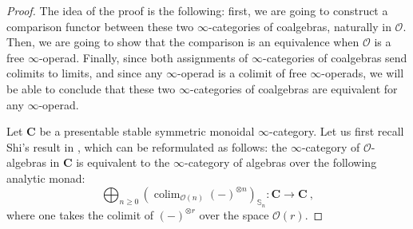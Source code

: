 \documentclass[a4paper,12pt]{amsart}
\DeclareMathOperator*{\colim}{colim}
\theoremstyle{plain}
\theoremstyle{definition}
\theoremstyle{remark}
\begin{document}
\begin{proof}
The idea of the proof is the following: first, we are going to construct a comparison functor between these two $\infty$-categories of coalgebras, naturally in $\mathscr O$. Then, we are going to show that the comparison is an equivalence when $\mathscr{O}$ is a free $\infty$-operad. Finally, since both assignments of $\infty$-categories of coalgebras send colimits to limits, and since any $\infty$-operad is a colimit of free $\infty$-operads, we will be able to conclude that these two $\infty$-categories of coalgebras are equivalent for any $\infty$-operad. 


Let $\mathbf{C}$ be a presentable stable symmetric monoidal $\infty$-category. Let us first recall Shi's result in \cite[Theorem A.2.0.3]{ShiPhD}, which can be reformulated as follows: the $\infty$-category of $\mathscr{O}$-algebras in $\mathbf{C}$ is equivalent to the $\infty$-category of algebras over the following analytic monad:
\[
\bigoplus_{n \geq 0} \left(\colim_{\mathscr{O}(n)} (-)^{\otimes n} \right)_{\mathbb{S}_n}: \mathbf{C} \longrightarrow \mathbf{C}~, 
\]
where one takes the colimit of $(-)^{\otimes r}$ over the space $\mathscr{O}(r)$. 



\end{proof}
\end{document}
